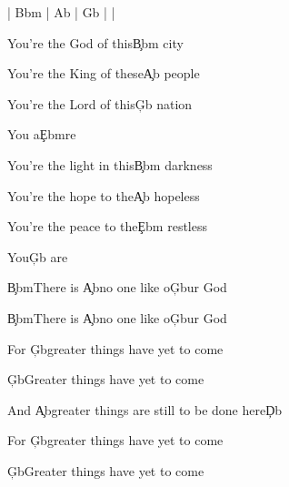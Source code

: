 \documentclass[9pt]{extarticle}
\begin{document}
\bsong

\bi
| Bbm | Ab | Gb |  |
\ei

\bv
You're the God of this\c{Bbm} city

You're the King of these\c{Ab} people

You're the Lord of this\c{Gb} nation

You a\c{Ebm}re

You're the light in this\c{Bbm} darkness

You're the hope to the\c{Ab} hopeless

You're the peace to the\c{Ebm} restless

You\c{Gb} are
\ev

\bp
\c{Bbm}There is \c{Ab}no one like o\c{Gb}ur God

\c{Bbm}There is \c{Ab}no one like o\c{Gb}ur God
\ep

\bc
For \c{Gb}greater things have yet to come


\c{Gb}Greater things have yet to come

And \c{Ab}greater things are still to be done here\c{Db}
\ec



\bc
For \c{Gb}greater things have yet to come


\c{Gb}Greater things have yet to come

\ec





\esong
\end{document}
